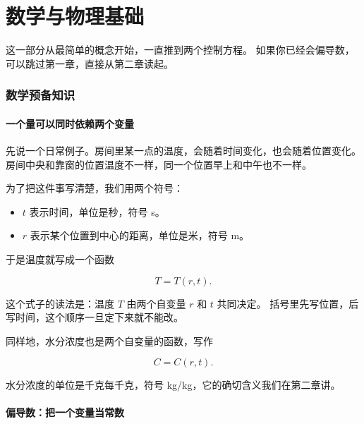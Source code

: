 \part{数学与物理基础}

这一部分从最简单的概念开始，一直推到两个控制方程。
如果你已经会偏导数，可以跳过第一章，直接从第二章读起。

\section{数学预备知识}

\subsection{一个量可以同时依赖两个变量}

先说一个日常例子。房间里某一点的温度，会随着时间变化，也会随着位置变化。
房间中央和靠窗的位置温度不一样，同一个位置早上和中午也不一样。

为了把这件事写清楚，我们用两个符号：

\begin{itemize}[leftmargin=1.8em,itemsep=2pt]
\item $t$ 表示时间，单位是秒，符号 s。
\item $r$ 表示某个位置到中心的距离，单位是米，符号 m。
\end{itemize}

于是温度就写成一个函数

\begin{equation}
T = T(r,t).
\end{equation}

这个式子的读法是：温度 $T$ 由两个自变量 $r$ 和 $t$ 共同决定。
括号里先写位置，后写时间，这个顺序一旦定下来就不能改。

同样地，水分浓度也是两个自变量的函数，写作

\begin{equation}
C = C(r,t).
\end{equation}

水分浓度的单位是千克每千克，符号 kg/kg，它的确切含义我们在第二章讲。

\subsection{偏导数：把一个变量当常数}

